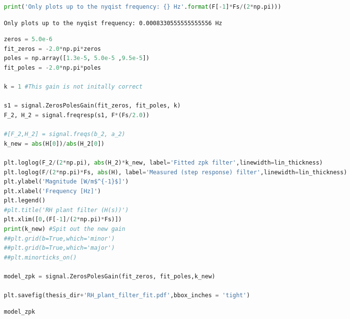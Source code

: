 \begin{spacing}{1.2} \begin{lstlisting}[frame=single,language=Python]
print('Only plots up to the nyqist frequency: {} Hz'.format(F[-1]*Fs/(2*np.pi)))
\end{lstlisting} \end{spacing}

\begin{spacing}{1.2} \begin{lstlisting}
Only plots up to the nyqist frequency: 0.0008330555555555556 Hz
\end{lstlisting} \end{spacing}

\begin{spacing}{1.2} \begin{lstlisting}[frame=single,language=Python]
zeros = 5.0e-6
fit_zeros = -2.0*np.pi*zeros
poles = np.array([1.3e-5, 5.0e-5 ,9.5e-5])
fit_poles = -2.0*np.pi*poles

k = 1 #This gain is not initally correct

s1 = signal.ZerosPolesGain(fit_zeros, fit_poles, k)
F_2, H_2 = signal.freqresp(s1, F*(Fs/2.0))

#[F_2,H_2] = signal.freqs(b_2, a_2)
k_new = abs(H[0])/abs(H_2[0])

plt.loglog(F_2/(2*np.pi), abs(H_2)*k_new, label='Fitted zpk filter',linewidth=lin_thickness)
plt.loglog(F/(2*np.pi)*Fs, abs(H), label='Measured (step response) filter',linewidth=lin_thickness)
plt.ylabel('Magnitude [W/m$^{-1}$]')
plt.xlabel('Frequency [Hz]')
plt.legend()
#plt.title('RH plant filter (H(s))')
plt.xlim([0,(F[-1]/(2*np.pi)*Fs)])
print(k_new) #Spit out the new gain
##plt.grid(b=True,which='minor')
##plt.grid(b=True,which='major')
##plt.minorticks_on()

model_zpk = signal.ZerosPolesGain(fit_zeros, fit_poles,k_new)

plt.savefig(thesis_dir+'RH_plant_filter_fit.pdf',bbox_inches = 'tight')
\end{lstlisting} \end{spacing}


\begin{spacing}{1.2} \begin{lstlisting}[frame=single,language=Python]
model_zpk
\end{lstlisting} \end{spacing}

